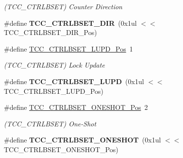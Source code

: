 \begin{DoxyCompactItemize}
\begin{DoxyCompactList}\small\item\em (T\+C\+C\+\_\+\+C\+T\+R\+L\+B\+S\+E\+T) Counter Direction \end{DoxyCompactList}\item 
\hypertarget{group___s_a_m_l21___t_c_c_ga5d1437ee9c5d50fbeadd8967487ce443}{}\#define {\bfseries T\+C\+C\+\_\+\+C\+T\+R\+L\+B\+S\+E\+T\+\_\+\+D\+I\+R}~(0x1ul $<$$<$ T\+C\+C\+\_\+\+C\+T\+R\+L\+B\+S\+E\+T\+\_\+\+D\+I\+R\+\_\+\+Pos)\label{group___s_a_m_l21___t_c_c_ga5d1437ee9c5d50fbeadd8967487ce443}

\item 
\hypertarget{group___s_a_m_l21___t_c_c_ga216bd04a3921cab0588eeb58aa05ffe1}{}\#define \hyperlink{group___s_a_m_l21___t_c_c_ga216bd04a3921cab0588eeb58aa05ffe1}{T\+C\+C\+\_\+\+C\+T\+R\+L\+B\+S\+E\+T\+\_\+\+L\+U\+P\+D\+\_\+\+Pos}~1\label{group___s_a_m_l21___t_c_c_ga216bd04a3921cab0588eeb58aa05ffe1}

\begin{DoxyCompactList}\small\item\em (T\+C\+C\+\_\+\+C\+T\+R\+L\+B\+S\+E\+T) Lock Update \end{DoxyCompactList}\item 
\hypertarget{group___s_a_m_l21___t_c_c_ga113271f15d4caa2a1455a50a16dd0fea}{}\#define {\bfseries T\+C\+C\+\_\+\+C\+T\+R\+L\+B\+S\+E\+T\+\_\+\+L\+U\+P\+D}~(0x1ul $<$$<$ T\+C\+C\+\_\+\+C\+T\+R\+L\+B\+S\+E\+T\+\_\+\+L\+U\+P\+D\+\_\+\+Pos)\label{group___s_a_m_l21___t_c_c_ga113271f15d4caa2a1455a50a16dd0fea}

\item 
\hypertarget{group___s_a_m_l21___t_c_c_gad9dafdc89e3eef8e659e9e9baba76a9f}{}\#define \hyperlink{group___s_a_m_l21___t_c_c_gad9dafdc89e3eef8e659e9e9baba76a9f}{T\+C\+C\+\_\+\+C\+T\+R\+L\+B\+S\+E\+T\+\_\+\+O\+N\+E\+S\+H\+O\+T\+\_\+\+Pos}~2\label{group___s_a_m_l21___t_c_c_gad9dafdc89e3eef8e659e9e9baba76a9f}

\begin{DoxyCompactList}\small\item\em (T\+C\+C\+\_\+\+C\+T\+R\+L\+B\+S\+E\+T) One-\/\+Shot \end{DoxyCompactList}\item 
\hypertarget{group___s_a_m_l21___t_c_c_ga64efc8c20e514a9d748a19b838bd63fb}{}\#define {\bfseries T\+C\+C\+\_\+\+C\+T\+R\+L\+B\+S\+E\+T\+\_\+\+O\+N\+E\+S\+H\+O\+T}~(0x1ul $<$$<$ T\+C\+C\+\_\+\+C\+T\+R\+L\+B\+S\+E\+T\+\_\+\+O\+N\+E\+S\+H\+O\+T\+\_\+\+Pos)\label{group___s_a_m_l21___t_c_c_ga64efc8c20e514a9d748a19b838bd63fb}


\end{DoxyCompactItemize}
